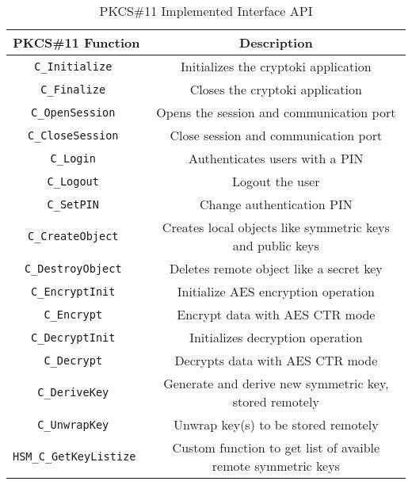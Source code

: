 \begin{table}[]
\centering
\def\arraystretch{1.5}
\begin{tabular}{|c|c|}
	\hline
	\textbf{PKCS\#11 Function} & \textbf{Description} \\ \hline
	\texttt{C\_Initialize		}& Initializes the cryptoki application\\ \hline
	\texttt{C\_Finalize		}& Closes the cryptoki application\\ \hline
	\texttt{C\_OpenSession		}& Opens the session and communication port\\ \hline
	\texttt{C\_CloseSession 	}& Close session and communication port\\ \hline
	\texttt{C\_Login        	}& Authenticates users with a PIN\\ \hline
	\texttt{C\_Logout        	}& Logout the user\\ \hline
	\texttt{C\_SetPIN       	}& Change authentication PIN\\ \hline
	\texttt{C\_CreateObject 	}& Creates local objects like symmetric keys and public keys\\ \hline
	\texttt{C\_DestroyObject	}& Deletes remote object like a secret key\\ \hline
	\texttt{C\_EncryptInit  	}& Initialize AES encryption operation\\ \hline
	\texttt{C\_Encrypt      	}& Encrypt data with AES CTR mode\\ \hline
	\texttt{C\_DecryptInit  	}& Initializes decryption operation\\ \hline
	\texttt{C\_Decrypt      	}& Decrypts data with AES CTR mode\\ \hline
	\texttt{C\_DeriveKey		}& Generate and derive new symmetric key, stored remotely\\ \hline
	\texttt{C\_UnwrapKey		}& Unwrap key(s) to be stored remotely\\ \hline
	\texttt{HSM\_C\_GetKeyListize	}& Custom function to get list of avaible remote symmetric keys\\ \hline
\end{tabular}
\caption{PKCS\#11 Implemented Interface API}
\label{tab:pkcs11-api}
\end{table}
